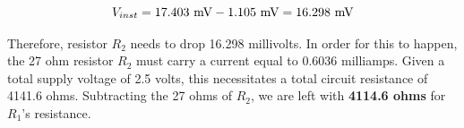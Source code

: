 $$V_{inst} = 17.403 \hbox{ mV} - 1.105 \hbox{ mV} = 16.298 \hbox{ mV}$$

\vskip 10pt

Therefore, resistor $R_2$ needs to drop 16.298 millivolts.  In order for this to happen, the 27 ohm resistor $R_2$ must carry a current equal to 0.6036 milliamps.  Given a total supply voltage of 2.5 volts, this necessitates a total circuit resistance of 4141.6 ohms.  Subtracting the 27 ohms of $R_2$, we are left with {\bf 4114.6 ohms} for $R_1$'s resistance.



